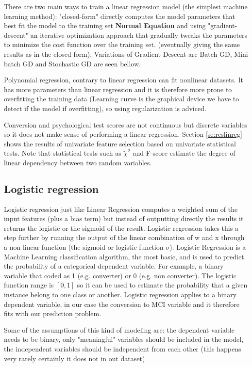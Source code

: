 \documentclass[11pt]{article}
\begin{document}
There are two main ways to train a linear regression model (the simplest machine learning method): "closed-form" directly computes the model parameters that best fit the model to the training set \textbf{Normal Equation} and using "gradient-descent" an iterative optimization approach that gradually tweaks the parameters to minimize the cost function over the training set. (eventually giving the same results as in the closed form). Variations of Gradient Descent are Batch GD, Mini batch GD and Stochastic GD are seen bellow.

Polynomial regression, contrary to linear regression can fit nonlinear datasets. It has more parameters than linear regression and it is therefore more prone to overfitting the training data (Learning curve is the graphical device we have to detect if the model if overfitting), so using regularization is adviced.

Conversion and psychological test scores are not continuous but discrete variables so it does not make sense of performing a linear regression. Section \ref{se:reslinreg} shows the results of univariate feature selection based on univariate statistical tests. Note that statistical tests such as $\tilde{\chi}^2$ and F-score estimate the degree of linear dependency between two random variables.


\subsection{Logistic regression}
\label{sse:logreg}

Logistic regression just like Linear Regression computes a weighted sum of the input features (plus a bias term) but instead of outputting directly the results it returns the logistic or the sigmoid of the result. Logistic regression takes this a step further by running the output  of the linear combination of w and x through a non linear function (the sigmoid or logistic function $\sigma$). Logistic Regression is a Machine Learning classification algorithm, the most basic, and is used to predict the probability of a categorical dependent variable. For example, a binary variable that coded as 1 (e.g. converter) or 0 (e.g. non converter). The logistic function range is $[0,1]$ so it can be used to estimate the probability that a given instance belong to one class or another. Logistic regression applies to a binary dependent variable, in our case the conversion to MCI variable and it therefore fits with our prediction problem.

Some of the assumptions of this kind of modeling are: the dependent variable needs to be binary, only "meaningful" variables should be included in the model, the independent variables should be independent from each other (this happens very rarely certainly it does not in out dataset) 
\end{document}

